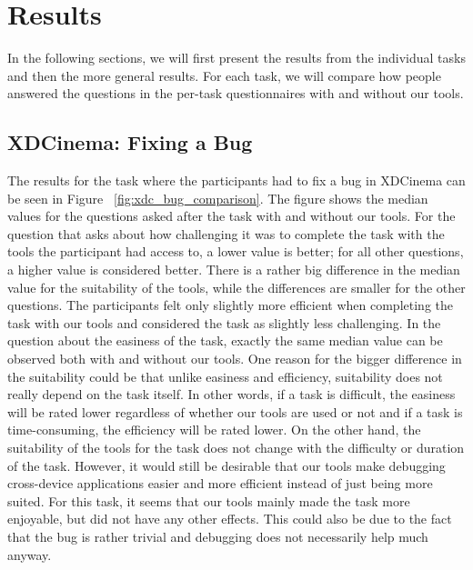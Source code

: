 \section{Results}

In the following sections, we will first present the results from the individual tasks and then the more general results. For each task, we will compare how people answered the questions in the per-task questionnaires with and without our tools. 

\subsection{XDCinema: Fixing a Bug}

The results for the task where the participants had to fix a bug in XDCinema can be seen in Figure ~\ref{fig:xdc_bug_comparison}. The figure shows the median values for the questions asked after the task with and without our tools. For the question that asks about how challenging it was to complete the task with the tools the participant had access to, a lower value is better; for all other questions, a higher value is considered better. There is a rather big difference in the median value for the suitability of the tools, while the differences are smaller for the other questions. The participants felt only slightly more efficient when completing the task with our tools and considered the task as slightly less challenging. In the question about the easiness of the task, exactly the same median value can be observed both with and without our tools. One reason for the bigger difference in the suitability could be that unlike easiness and efficiency, suitability does not really depend on the task itself. In other words, if a task is difficult, the easiness will be rated lower regardless of whether our tools are used or not and if a task is time-consuming, the efficiency will be rated lower. On the other hand, the suitability of the tools for the task does not change with the difficulty or duration of the task. However, it would still be desirable that our tools make debugging cross-device applications easier and more efficient instead of just being more suited. For this task, it seems that our tools mainly made the task more enjoyable, but did not have any other effects. This could also be due to the fact that the bug is rather trivial and debugging does not necessarily help much anyway.

